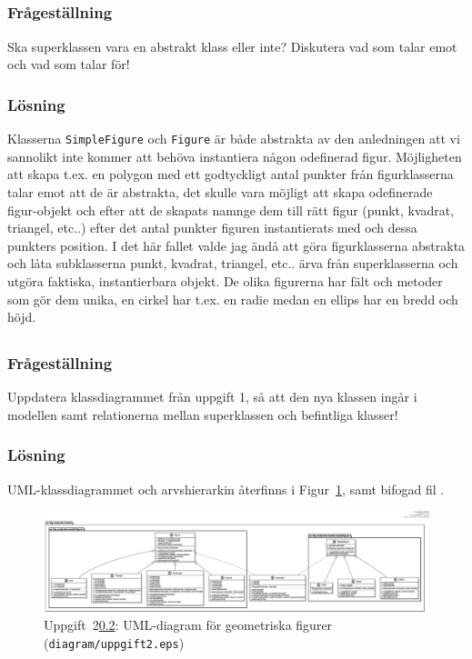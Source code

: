 \subsection{}\label{sec:uppg2b}
\subsubsection*{Frågeställning}
Ska superklassen vara en abstrakt klass eller inte? Diskutera vad som talar
emot och vad som talar för!

\subsubsection*{Lösning}
Klasserna \texttt{SimpleFigure} och \texttt{Figure} är både abstrakta av den
anledningen att vi sannolikt inte kommer att behöva instantiera någon odefinerad
figur. Möjligheten att skapa t.ex. en polygon med ett godtyckligt antal punkter
från figurklasserna talar emot att de är abstrakta, det skulle vara möjligt att
skapa odefinerade figur-objekt och efter att de skapats namnge dem till 
rätt figur (punkt, kvadrat, triangel, etc..) efter det antal punkter figuren 
instantierats med och dessa punkters position.
I det här fallet valde jag ändå att göra figurklasserna abstrakta och låta
subklasserna punkt, kvadrat, triangel, etc.. ärva från superklasserna och
utgöra faktiska, instantierbara objekt.
De olika figurerna har fält och metoder som gör dem unika, en cirkel har t.ex.
en radie medan en ellips har en bredd och höjd.


\subsection{}\label{sec:uppg2c}
\subsubsection*{Frågeställning}
Uppdatera klassdiagrammet från uppgift 1, så att den nya klassen ingår i
modellen samt relationerna mellan superklassen och befintliga klasser!

\subsubsection*{Lösning}
\par UML-klassdiagrammet och arvshierarkin återfinns i Figur~\ref{fig:uppg2a},
 samt bifogad fil .

\begin{figure}
\centering
\includegraphics[width=\linewidth]{diagram/uppgift2.eps}
\caption{Uppgift~2\ref{sec:uppg2c}: UML-diagram för geometriska figurer
(\texttt{diagram/uppgift2.eps})}
\label{fig:uppg2a}
\end{figure}


